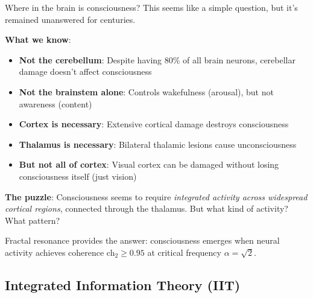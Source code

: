 \begin{intuitive}
Where in the brain is consciousness? This seems like a simple question, but it's remained unanswered for centuries.

\textbf{What we know}:
\begin{itemize}
\item \textbf{Not the cerebellum}: Despite having 80\% of all brain neurons, cerebellar damage doesn't affect consciousness
\item \textbf{Not the brainstem alone}: Controls wakefulness (arousal), but not awareness (content)
\item \textbf{Cortex is necessary}: Extensive cortical damage destroys consciousness
\item \textbf{Thalamus is necessary}: Bilateral thalamic lesions cause unconsciousness
\item \textbf{But not all of cortex}: Visual cortex can be damaged without losing consciousness itself (just vision)
\end{itemize}

\textbf{The puzzle}: Consciousness seems to require \textit{integrated activity across widespread cortical regions}, connected through the thalamus. But what kind of activity? What pattern?

Fractal resonance provides the answer: consciousness emerges when neural activity achieves coherence ch$_2 \geq 0.95$ at critical frequency $\alpha = \sqrt{2}$.
\end{intuitive}

\subsection{Integrated Information Theory (IIT)}


